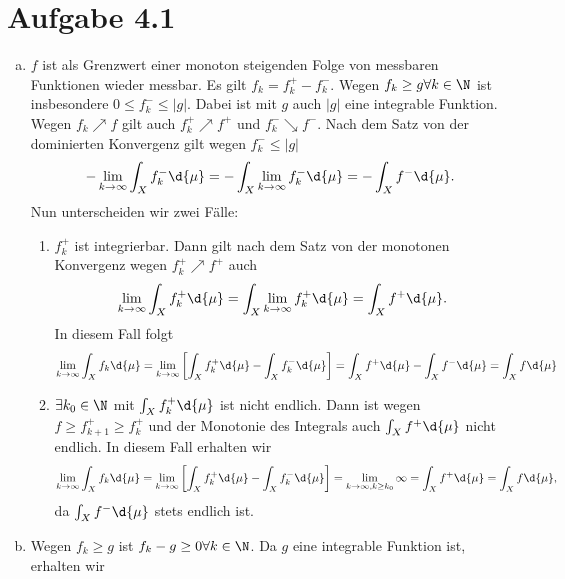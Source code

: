 \documentclass{article}
\begin{document}
\def\headheight{25pt}
    \section*{Aufgabe 4.1}  
    \begin{enumerate}[(a)]
        \item $f$ ist als Grenzwert einer monoton steigenden Folge von messbaren Funktionen wieder messbar.
        Es gilt $f_k = f_k^+ - f_k^-$. Wegen $f_k \ge g \forall k \in \N$ ist insbesondere $0 \leq f_k^- \leq |g|$. 
        Dabei ist mit $g$ auch $|g|$ eine integrable Funktion.
        Wegen $f_k \nearrow f$ gilt auch $f_k^+ \nearrow f^+$ und $f_k^- \searrow f^-$. 
        Nach dem Satz von der dominierten Konvergenz gilt wegen $f_k^- \leq |g|$
        \[
            -\lim\limits_{k \to \infty} \int_X f_k^- \d{\mu} = -\int_X \lim\limits_{k \to \infty} f_k^- \d{\mu} = - \int_X f^- \d{\mu}.
        \]
        Nun unterscheiden wir zwei Fälle: 
        \begin{enumerate}[(1.)]
            \item $f_k^+$ ist integrierbar. Dann gilt nach dem Satz von der monotonen Konvergenz wegen $f_k^+ \nearrow f^+$ auch
            \[
                \lim\limits_{k \to \infty} \int_X f_k^+ \d{\mu} = \int_X \lim\limits_{k \to \infty} f_k^+ \d{\mu} = \int_X f^+ \d{\mu}.
            \]
            In diesem Fall folgt 
            \[
                \lim\limits_{k \to \infty} \int_X f_k\d{\mu} 
                = \lim\limits_{k \to \infty} \left[\int_X f_k^+ \d{\mu} - \int_Xf_k^- \d{\mu}\right] 
                = \int_X f^+ \d{\mu} - \int_X f^- \d{\mu} 
                = \int_X f \d{\mu}
            \]
            \item $\exists k_0\in \N$ mit $\int_X f_k^+ \d{\mu}$ ist nicht endlich.
            Dann ist wegen $f \geq f_{k+1}^+ \geq f_k^+$ und der Monotonie des Integrals auch $\int_X f^+ \d{\mu}$ nicht endlich.
            In diesem Fall erhalten wir
            \[
                \lim\limits_{k \to \infty} \int_X f_k\d{\mu} 
                = \lim\limits_{k \to \infty} \left[\int_X f_k^+ \d{\mu} - \int_Xf_k^- \d{\mu}\right]
                = \lim\limits_{k \to \infty, k \geq k_0} \infty 
                = \int_X f^+ \d{\mu} =  \int_X f \d{\mu},
            \]
            da $\int_X f^- \d{\mu}$ stets endlich ist.
        \end{enumerate}
        \item Wegen $f_k \geq g$ ist $f_k - g \geq 0\forall k \in \N$.
        Da $g$ eine integrable Funktion ist, erhalten wir

\end{enumerate}
\end{document}
